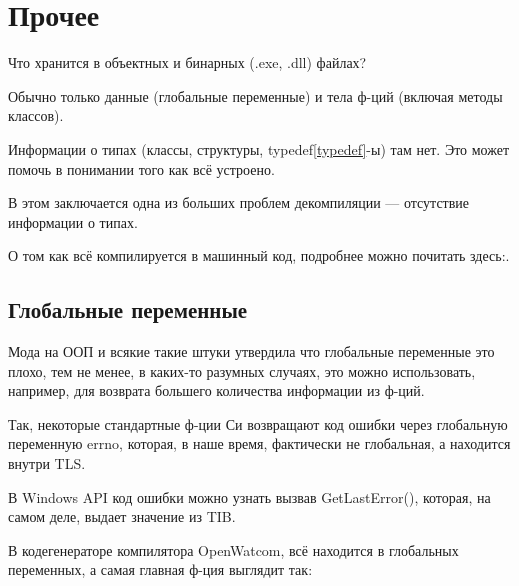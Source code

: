 ﻿\chapter{Прочее}

Что хранится в объектных и бинарных (.exe, .dll) файлах?

Обычно только данные (глобальные переменные) и тела ф-ций (включая методы классов).

Информации о типах (классы, структуры, typedef\ref{typedef}-ы) там нет. 
Это может помочь в понимании того как всё устроено.

В этом заключается одна из больших проблем декомпиляции --- отсутствие информации о типах.


О том как всё компилируется в машинный код, подробнее можно почитать здесь:\cite{REBook}.

\section{Глобальные переменные}

Мода на ООП и всякие такие штуки утвердила что глобальные переменные это плохо, тем не менее, в каких-то разумных
случаях, это можно использовать, например, для возврата большего количества информации из ф-ций. 

Так, некоторые стандартные ф-ции Си возвращают код ошибки через глобальную переменную errno, которая, в наше
время, фактически не глобальная, а находится внутри \ac{TLS}.

В Windows API код ошибки можно узнать вызвав GetLastError(), 
которая, на самом деле, выдает значение из \ac{TIB}.

В кодегенераторе компилятора OpenWatcom, всё находится в глобальных переменных,
а самая главная ф-ция выглядит так:

